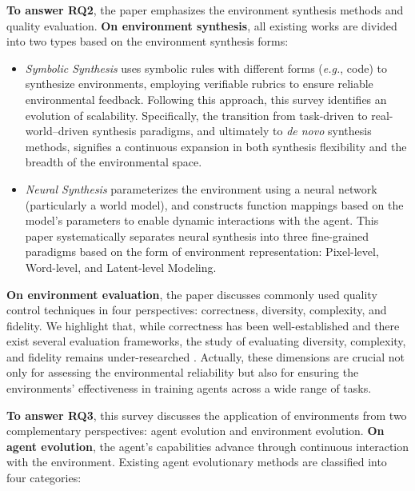 \documentclass{llmxive}
\begin{document}
\textbf{To answer RQ2}, the paper emphasizes the environment synthesis methods and quality evaluation. \textbf{On environment synthesis}, all existing works are divided into two types based on the environment synthesis forms: 

\begin{itemize}

\item \textit{Symbolic Synthesis} uses symbolic rules with different forms (\textit{e.g.}, code) to synthesize environments, employing verifiable rubrics to ensure reliable environmental feedback. Following this approach, this survey identifies an evolution of scalability.
Specifically, the transition from task-driven to real-world–driven synthesis paradigms, and ultimately to \textit{de novo} synthesis methods, signifies a continuous expansion in both synthesis flexibility and the breadth of the environmental space.
\item \textit{Neural Synthesis} parameterizes the environment using a neural network (particularly a world model), and constructs function mappings based on the model's parameters to enable dynamic interactions with the agent. This paper systematically separates neural synthesis into three fine-grained paradigms based on the form of environment representation: Pixel-level, Word-level, and Latent-level Modeling.

\end{itemize}

\textbf{On environment evaluation}, the paper discusses commonly used quality control techniques in four perspectives: correctness, diversity, complexity, and fidelity. We highlight that, while correctness has been well-established and there exist several evaluation frameworks, the study of evaluating diversity, complexity, and fidelity remains under-researched \cite{AgentsCourt, MMR-V, MMR-Life}. Actually, these dimensions are crucial not only for assessing the environmental reliability but also for ensuring the environments' effectiveness in training agents across a wide range of tasks.


\textbf{To answer RQ3}, this survey discusses the application of environments from two complementary perspectives: agent evolution and environment evolution. 
\textbf{On agent evolution}, the agent’s capabilities advance through continuous interaction with the environment. Existing agent evolutionary methods are classified into four categories:

\end{document}
